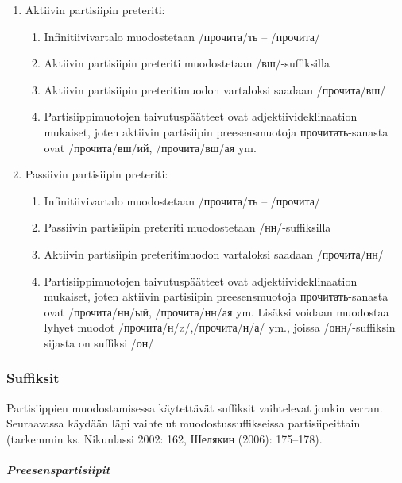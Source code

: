 \documentclass[]{scrreprt}
\providecommand{\tightlist}{%
  \setlength{\itemsep}{0pt}\setlength{\parskip}{0pt}}
\begin{document}
\begin{enumerate}
\def\labelenumi{\alph{enumi})}
\tightlist
\item
  Aktiivin partisiipin preteriti:

  \begin{enumerate}
  \def\labelenumii{\arabic{enumii}.}
  \tightlist
  \item
    Infinitiivivartalo muodostetaan /прочита/ть -- /прочита/
  \item
    Aktiivin partisiipin preteriti muodostetaan /вш/-suffiksilla
  \item
    Aktiivin partisiipin preteritimuodon vartaloksi saadaan /прочита/вш/
  \item
    Partisiippimuotojen taivutuspäätteet ovat adjektiivideklinaation
    mukaiset, joten aktiivin partisiipin preesensmuotoja
    прочитать-sanasta ovat /прочита/вш/ий, /прочита/вш/ая ym.
  \end{enumerate}
\item
  Passiivin partisiipin preteriti:

  \begin{enumerate}
  \def\labelenumii{\arabic{enumii}.}
  \tightlist
  \item
    Infinitiivivartalo muodostetaan /прочита/ть -- /прочита/
  \item
    Passiivin partisiipin preteriti muodostetaan /нн/-suffiksilla
  \item
    Aktiivin partisiipin preteritimuodon vartaloksi saadaan /прочита/нн/
  \item
    Partisiippimuotojen taivutuspäätteet ovat adjektiivideklinaation
    mukaiset, joten aktiivin partisiipin preesensmuotoja
    прочитать-sanasta ovat /прочита/нн/ый, /прочита/нн/ая ym. Lisäksi
    voidaan muodostaa lyhyet muodot /прочита/н/ø/,/прочита/н/а/ ym.,
    joissa /онн/-suffiksin sijasta on suffiksi /он/
  \end{enumerate}
\end{enumerate}

\subsubsection{Suffiksit}\label{suffiksit}

Partisiippien muodostamisessa käytettävät suffiksit vaihtelevat jonkin
verran. Seuraavassa käydään läpi vaihtelut muodostussuffikseissa
partisiipeittain (tarkemmin ks. Nikunlassi 2002: 162, Шелякин (2006):
175--178).

\subparagraph{Preesenspartisiipit}\label{preesenspartisiipit}
\end{document}
